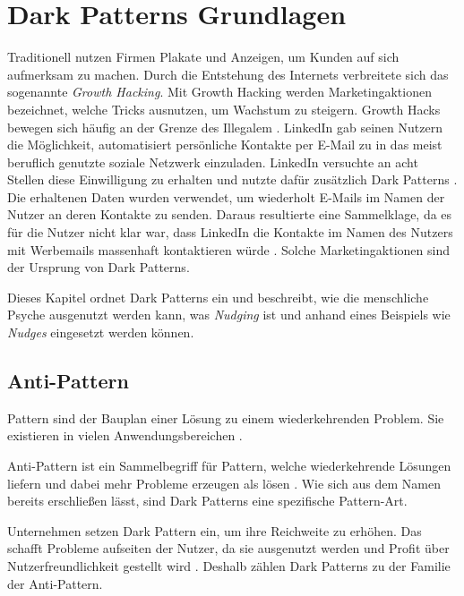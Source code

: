 \documentclass[conference,compsoc,final,a4paper]{IEEEtran}
\begin{document}
\section{Dark Patterns Grundlagen}
\label{chap:Grundlagen}

Traditionell nutzen Firmen Plakate und Anzeigen, um Kunden auf sich aufmerksam zu machen. Durch die Entstehung des Internets verbreitete sich das sogenannte \textit{Growth Hacking}. Mit Growth Hacking werden Marketingaktionen bezeichnet, welche Tricks ausnutzen, um Wachstum zu steigern. Growth Hacks bewegen sich häufig an der Grenze des Illegalem \autocite{Narayanan2020}. LinkedIn gab seinen Nutzern die Möglichkeit, automatisiert persönliche Kontakte per E-Mail zu in das meist beruflich genutzte soziale Netzwerk einzuladen. LinkedIn versuchte an acht Stellen diese Einwilligung zu erhalten und nutzte dafür zusätzlich Dark Patterns \autocite{Schlosser2015}. Die erhaltenen Daten wurden verwendet, um wiederholt E-Mails im Namen der Nutzer an deren Kontakte zu senden. Daraus resultierte eine Sammelklage, da es für die Nutzer nicht klar war, dass LinkedIn die Kontakte im Namen des Nutzers mit Werbemails massenhaft kontaktieren würde \autocite{Strange2015}. Solche Marketingaktionen sind der Ursprung von Dark Patterns.

Dieses Kapitel ordnet Dark Patterns ein und beschreibt, wie die menschliche Psyche ausgenutzt werden kann, was \textit{Nudging} ist und anhand eines Beispiels wie \textit{Nudges} eingesetzt werden können.
\subsection{Anti-Pattern}
Pattern sind der Bauplan einer Lösung zu einem wiederkehrenden Problem. Sie existieren in vielen Anwendungsbereichen \autocite[S. 1]{MacDonald2019}.

Anti-Pattern ist ein Sammelbegriff für Pattern, welche wiederkehrende Lösungen liefern und dabei mehr Probleme erzeugen als lösen \autocite[S. 193-195]{MacDonald2019}. Wie sich aus dem Namen bereits erschließen lässt, sind Dark Patterns eine spezifische Pattern-Art.

Unternehmen setzen Dark Pattern ein, um ihre Reichweite zu erhöhen. Das schafft Probleme aufseiten der Nutzer, da sie ausgenutzt werden und Profit über Nutzerfreundlichkeit gestellt wird \autocite{Chivukula_2019}. Deshalb zählen Dark Patterns zu der Familie der Anti-Pattern.
\end{document}

